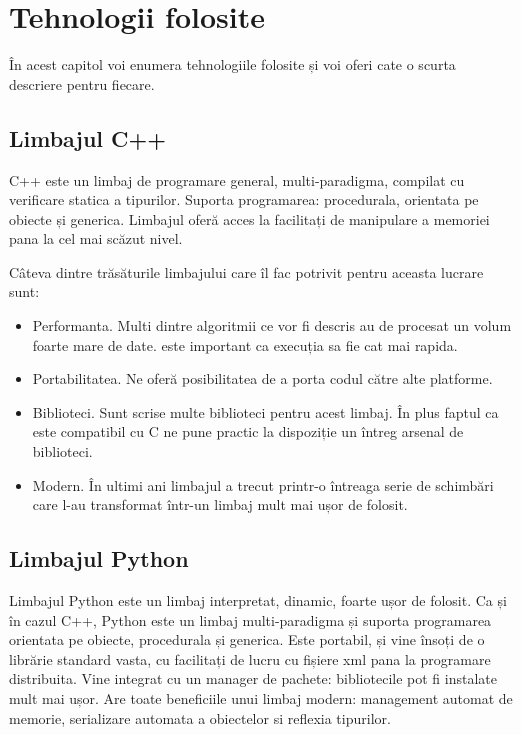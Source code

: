 \chapter{Tehnologii folosite}

În acest capitol voi enumera tehnologiile folosite și voi oferi cate o scurta descriere pentru fiecare.

\section{Limbajul C++}

C++ este un limbaj de programare general, multi-paradigma, compilat cu verificare statica a tipurilor.
Suporta programarea: procedurala, orientata pe obiecte și generica.
Limbajul oferă acces la facilitați de manipulare a memoriei pana la cel mai scăzut nivel.

Câteva dintre trăsăturile limbajului care îl fac potrivit pentru aceasta lucrare sunt:
\begin{itemize}
	\item Performanta. Multi dintre algoritmii ce vor fi descris au de procesat un volum foarte mare de date. este important ca execuția sa fie cat mai rapida.
	\item Portabilitatea. Ne oferă posibilitatea de a porta codul către alte platforme.
	\item Biblioteci. Sunt scrise multe biblioteci pentru acest limbaj. În plus faptul ca este compatibil cu C ne pune practic la dispoziție un întreg arsenal de biblioteci.
	\item Modern. În ultimi ani limbajul a trecut printr-o întreaga serie de schimbări care l-au transformat într-un limbaj mult mai ușor de folosit.
\end{itemize}


\section{Limbajul Python}

Limbajul Python este un limbaj interpretat, dinamic, foarte ușor de folosit.
Ca și în cazul C++, Python este un limbaj multi-paradigma și suporta programarea orientata pe obiecte, procedurala și generica.
Este portabil, și vine însoți de o librărie standard vasta, cu facilitați de lucru cu fișiere xml pana la programare distribuita.
Vine integrat cu un manager de pachete: bibliotecile pot fi instalate mult mai ușor.
Are toate beneficiile unui limbaj modern: management automat de memorie, serializare automata a obiectelor si reflexia tipurilor.

